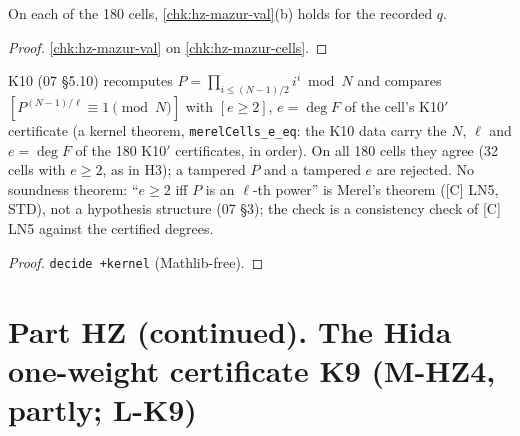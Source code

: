 \begin{theorem}\label{chk:hz-mazur-cells-cert}
  \leanok
  On each of the 180 cells, \ref{chk:hz-mazur-val}(b) holds for the recorded $q$.
\end{theorem}
\begin{proof}
  \leanok
  \ref{chk:hz-mazur-val} on \ref{chk:hz-mazur-cells}.
\end{proof}

\begin{definition}\label{orc:hz-merel}
  \leanok
  K10 (07 \S5.10) recomputes $P=\prod_{i\le(N-1)/2}i^i\bmod N$ and compares $[P^{(N-1)/\ell}\equiv1\pmod N]$ with $[e\ge2]$, $e=\deg F$ of the
  cell's K10$'$ certificate (a kernel theorem, \texttt{merelCells\_e\_eq}: the K10 data carry the $N$, $\ell$ and $e=\deg F$ of the 180
  K10$'$ certificates, in order). On all 180 cells they agree (32 cells with $e\ge2$, as in H3); a tampered $P$ and a tampered $e$ are rejected.
  No soundness theorem: ``$e\ge2$ iff $P$ is an $\ell$-th power'' is Merel's theorem ([C] LN5, STD), not a hypothesis structure (07 \S3);
  the check is a consistency check of [C] LN5 against the certified degrees.
\end{definition}
\begin{proof}
  \leanok
  \texttt{decide +kernel} (Mathlib-free).
\end{proof}

\chapter{Part HZ (continued). The Hida one-weight certificate K9 (M-HZ4, partly; L-K9)}


